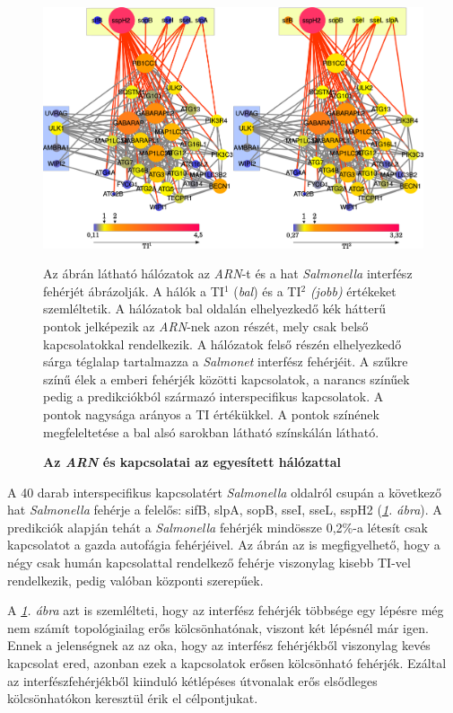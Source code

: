 \documentclass[a4paper,12pt]{article}
\newenvironment{imgdesc}{
		\small
		\singlespacing
		\begin{center}

	}{
		\end{center}
	}
\begin{document}
				\begin{figure}[H]
					\includegraphics[scale=0.4]{img/connection_prots_v2_complete.pdf}
					\centering
					\caption{ \textbf{Az \textit{ARN} és kapcsolatai az egyesített hálózattal}}
					\label{fig:connection}
					\begin{imgdesc}
					Az ábrán látható hálózatok az \textit{ARN}-t és a hat \textit{Salmonella} interfész fehérjét ábrázolják. A hálók a TI$^1$ (\textit{bal}) és a TI$^2$ \textit{(jobb)} értékeket szemléltetik. A hálózatok bal oldalán elhelyezkedő kék hátterű pontok jelképezik az \textit{ARN}-nek azon részét, mely csak belső kapcsolatokkal rendelkezik. A hálózatok felső részén elhelyezkedő sárga téglalap tartalmazza a \textit{Salmonet} interfész fehérjéit. A szűkre színű élek a emberi fehérjék közötti kapcsolatok, a narancs színűek pedig a predikciókból származó interspecifikus kapcsolatok. A pontok nagysága arányos a TI értékükkel. A pontok színének megfeleltetése a bal alsó sarokban látható színskálán látható.
					\end{imgdesc}
				\end{figure}


		 A 40 darab interspecifikus kapcsolatért \textit{Salmonella} oldalról csupán a következő hat \textit{Salmonella} fehérje a felelős: sifB, slpA, sopB, sseI, sseL, sspH2 (\textit{\ref{fig:connection}. ábra}). A predikciók alapján tehát a \textit{Salmonella} fehérjék mindössze 0,2\%-a létesít csak kapcsolatot a gazda autofágia fehérjéivel. Az ábrán az is megfigyelhető, hogy a négy csak humán kapcsolattal rendelkező fehérje viszonylag kisebb TI-vel rendelkezik, pedig valóban központi szerepűek.

		 A \textit{\ref{fig:connection}. ábra} azt is szemlélteti, hogy az interfész fehérjék többsége egy lépésre még nem számít topológiailag erős kölcsönhatónak, viszont két lépésnél már igen. Ennek a jelenségnek az az oka, hogy az interfész fehérjékből viszonylag kevés kapcsolat ered, azonban ezek a kapcsolatok erősen kölcsönható fehérjék. Ezáltal az interfészfehérjékből kiinduló kétlépéses útvonalak erős elsődleges kölcsönhatókon keresztül érik el célpontjukat.
\end{document}
